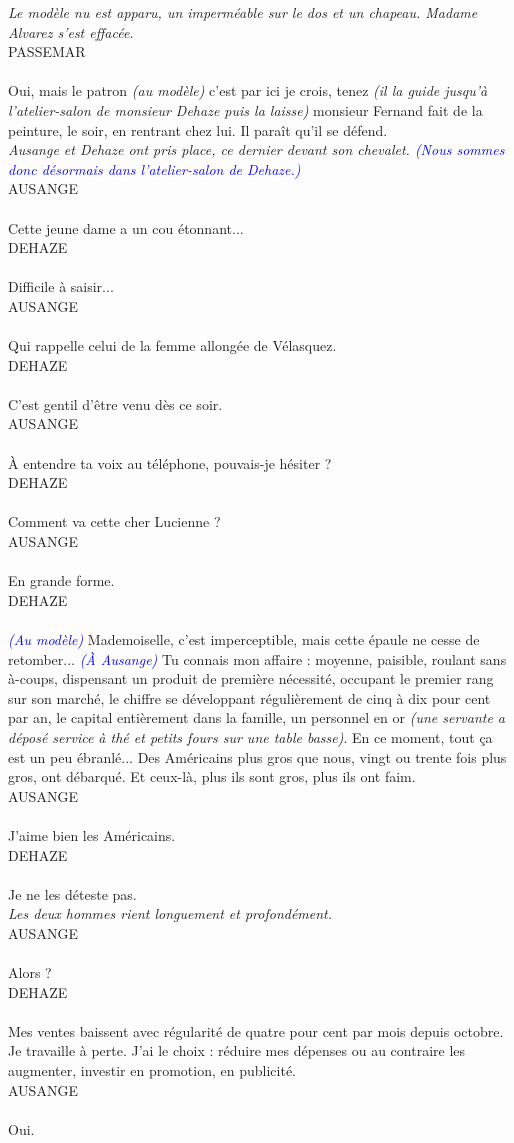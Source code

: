 \documentclass[a4paper]{report}
\newcounter{rem}[chapter]
\newcounter{demo}[chapter]
\newcommand{\annot}[1]{{\footnotesize \textcolor{blue}{\textit{(#1)}}}}
\newcommand{\repl}[2]{\uppercase{#1}\\\\#2\\}
\newcommand{\didas}[1]{\textit{#1}\\}
\begin{document}
\didas{Le modèle nu est apparu, un imperméable sur le dos et un chapeau. Madame Alvarez s'est effacée.}

\repl{Passemar}{Oui, mais le patron \textit{(au modèle)} c'est par ici je crois, tenez \textit{(il la guide jusqu'à l'atelier-salon de monsieur Dehaze puis la laisse)} monsieur Fernand fait de la peinture, le soir, en rentrant chez lui. Il paraît qu'il se défend.}

\didas{Ausange et Dehaze ont pris place, ce dernier devant son chevalet. \annot{Nous sommes donc désormais dans l'atelier-salon de Dehaze.}}

\repl{Ausange}{Cette jeune dame a un cou étonnant...}

\repl{Dehaze}{Difficile à saisir...}

\repl{Ausange}{Qui rappelle celui de la femme allongée de Vélasquez.}

\repl{Dehaze}{C'est gentil d'être venu dès ce soir.}

\repl{Ausange}{À entendre ta voix au téléphone, pouvais-je hésiter ?}

\repl{Dehaze}{Comment va cette cher Lucienne ?}

\repl{Ausange}{En grande forme.}

\repl{Dehaze}{\annot{Au modèle} Mademoiselle, c'est imperceptible, mais cette épaule ne cesse de retomber... \annot{À Ausange} Tu connais mon affaire : moyenne, paisible, roulant sans à-coups, dispensant un produit de première nécessité, occupant le premier rang sur son marché, le chiffre se développant régulièrement de cinq à dix pour cent par an, le capital entièrement dans la famille, un personnel en or \textit{(une servante a déposé service à thé et petits fours sur une table basse)}. En ce moment, tout ça est un peu ébranlé... Des Américains plus gros que nous, vingt ou trente fois plus gros, ont débarqué. Et ceux-là, plus ils sont gros, plus ils ont faim.}

\repl{Ausange}{J'aime bien les Américains.}

\repl{Dehaze}{Je ne les déteste pas.}

\didas{Les deux hommes rient longuement et profondément.}

\repl{Ausange}{Alors ?}

\repl{Dehaze}{Mes ventes baissent avec régularité de quatre pour cent par mois depuis octobre. Je travaille à perte. J'ai le choix : réduire mes dépenses ou au contraire les augmenter, investir en promotion, en publicité.}

\repl{Ausange}{Oui.}
\end{document}

